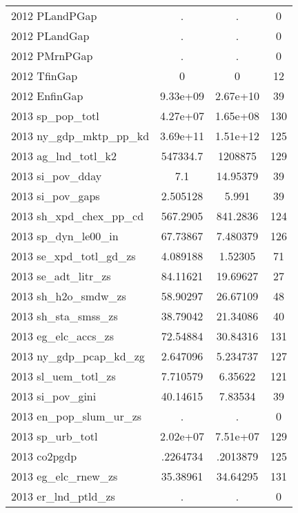 {\begin{tabular}{l*{1}{ccc}}
2012 PLandPGap      &           .&           .&           0\\
2012 PLandGap       &           .&           .&           0\\
2012 PMrnPGap       &           .&           .&           0\\
2012 TfinGap        &           0&           0&          12\\
2012 EnfinGap       &    9.33e+09&    2.67e+10&          39\\
2013 sp\_pop\_totl    &    4.27e+07&    1.65e+08&         130\\
2013 ny\_gdp\_mktp\_pp\_kd&    3.69e+11&    1.51e+12&         125\\
2013 ag\_lnd\_totl\_k2 &    547334.7&     1208875&         129\\
2013 si\_pov\_dday    &         7.1&    14.95379&          39\\
2013 si\_pov\_gaps    &    2.505128&       5.991&          39\\
2013 sh\_xpd\_chex\_pp\_cd&    567.2905&    841.2836&         124\\
2013 sp\_dyn\_le00\_in &    67.73867&    7.480379&         126\\
2013 se\_xpd\_totl\_gd\_zs&    4.089188&     1.52305&          71\\
2013 se\_adt\_litr\_zs &    84.11621&    19.69627&          27\\
2013 sh\_h2o\_smdw\_zs &    58.90297&    26.67109&          48\\
2013 sh\_sta\_smss\_zs &    38.79042&    21.34086&          40\\
2013 eg\_elc\_accs\_zs &    72.54884&    30.84316&         131\\
2013 ny\_gdp\_pcap\_kd\_zg&    2.647096&    5.234737&         127\\
2013 sl\_uem\_totl\_zs &    7.710579&     6.35622&         121\\
2013 si\_pov\_gini    &    40.14615&     7.83534&          39\\
2013 en\_pop\_slum\_ur\_zs&           .&           .&           0\\
2013 sp\_urb\_totl    &    2.02e+07&    7.51e+07&         129\\
2013 co2pgdp        &    .2264734&    .2013879&         125\\
2013 eg\_elc\_rnew\_zs &    35.38961&    34.64295&         131\\
2013 er\_lnd\_ptld\_zs &           .&           .&           0\\

\end{tabular}}
